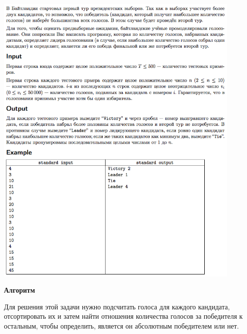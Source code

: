 \documentclass[a4paper,12pt]{article}
\begin{document}
\begin{center}
\includegraphics[width=0.9\textwidth]{OC_Europe/E.png}\\ [1cm]
\end{center}

\textbf{{\large Алгоритм}}

Для решения этой задачи нужно подсчитать голоса для каждого кандидата, отсортировать их и затем найти отношения количества голосов за победителя к остальным, чтобы определить, является он абсолютным победителем или нет. \\
\end{document}
